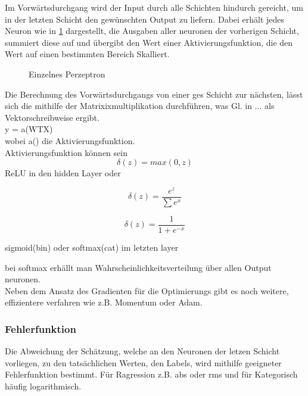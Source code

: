 Im Vorwärtsdurchgang wird der Input durch alle Schichten hindurch 
gereicht, um in der letzten Schicht den gewünschten Output zu liefern.
Dabei erhält jedes Neuron wie in \ref{fig:neuron} dargestellt, die Ausgaben aller
 neuronen der vorherigen Schicht, summiert diese auf und übergibt den Wert
  einer Aktivierungsfunktion, die den Wert auf einen bestimmten Bereich Skalliert.
 

\begin{figure}[htb]
    \centering
    
    \caption{Einzelnes Perzeptron}
    \label{fig:neuron}
\end{figure}

Die Berechnung des Vorwärtsdurchgangs von einer ges Schicht 
zur nächsten, lässt sich die mithilfe der Matrixixmultiplikation
durchführen, was Gl. in ... als Vektorschreibweise ergibt.
\\
y = a(WTX)\\
wobei a() die Aktivierungsfunktion.
\\
Aktivierungsfunktion können sein
\begin{equation}
    \label{eq:relu}
    \delta(z) = max(0,z)
\end{equation}
ReLU in den hidden Layer
oder

\begin{equation}
    \label{eq:softmax}
    \delta(z) = \frac{e^{z}}{\sum e^{x}}
\end{equation}

\begin{equation}
    \label{eq:sidmoid}
    \delta(z) = \frac{1}{1 + e^{-x}}
\end{equation}


sigmoid(bin) oder softmax(cat) im letzten layer

bei softmax erhällt man Wahrscheinlichkeitsverteilung über allen Output
neuronen.\\
Neben dem Ansatz des Gradienten für die Optimierungs 
gibt es noch weitere, effizientere verfahren wie z.B. Momentum oder Adam.


\subsubsection{Fehlerfunktion}

Die Abweichung der Schätzung, welche an den Neuronen der letzen Schicht 
vorliegen, zu den tatsächlichen Werten, den Labels, wird mithilfe geeigneter 
Fehlerfunktion bestimmt. Für Ragression z.B. abs oder rms und für Kategorisch
häufig logarithmisch.

